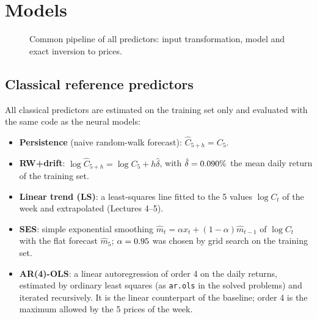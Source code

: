 \documentclass[11pt,a4paper]{article}
\begin{document}
\section{Models}
\label{sec:models}

\begin{figure}[tbp]
  \centering
  \resizebox{\linewidth}{!}{\unskip}
  \caption{Common pipeline of all predictors: input transformation, model and exact inversion to prices.}
  \label{fig:pipeline}
\end{figure}

\subsection{Classical reference predictors}
All classical predictors are estimated on the training set only and evaluated with the same code as the neural models:
\begin{itemize}[leftmargin=*]
  \item \textbf{Persistence} (naive random-walk forecast): $\hat C_{5+h}=C_5$.
  \item \textbf{RW+drift}: $\log\hat C_{5+h}=\log C_5+h\hat\delta$, with $\hat\delta=0.090\%$ the mean daily return of the training set.
  \item \textbf{Linear trend (LS)}: a least-squares line fitted to the 5 values $\log C_t$ of the week and extrapolated (Lectures 4--5).
  \item \textbf{SES}: simple exponential smoothing $\hat m_t=\alpha x_t+(1-\alpha)\hat m_{t-1}$ of $\log C_t$ with the flat forecast $\hat m_5$; $\alpha=0.95$ was chosen by grid search on the training set.
  \item \textbf{AR(4)-OLS}: a linear autoregression of order 4 on the daily returns, estimated by ordinary least squares (as \texttt{ar.ols} in the solved problems) and iterated recursively. It is the linear counterpart of the baseline; order 4 is the maximum allowed by the 5 prices of the week.
\end{itemize}
\end{document}
